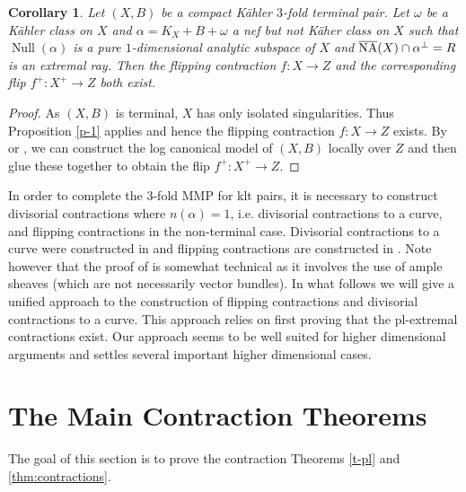 \documentclass[12pt]{amsart}
\theoremstyle{plain}
\newtheorem{corollary}[theorem]{Corollary}
\theoremstyle{remark}
\theoremstyle{definition}
\def\Null{\operatorname{Null}}
\newcommand{\<}{\leq}
\theoremstyle{definition}
\theoremstyle{definition}
\numberwithin{equation}{section}
\theoremstyle{remark}
\begin{document}
\begin{corollary}
    Let $(X,B)$ be a compact K\"ahler $3$-fold terminal pair. Let $\omega$ be a K\"ahler class on $X$ and $\alpha=K_X+B+\omega$ a nef but not K\"aher class on $X$ such that $\Null(\alpha)$ is a pure $1$-dimensional analytic subspace of $X$ and $\overline{\rm NA}(X)\cap \alpha ^\perp =R$ is an extremal ray. Then the flipping contraction $f:X\to Z$ and the corresponding flip $f^+:X^+\to Z$ both exist.
\end{corollary}
\begin{proof}
    As $(X,B)$ is  terminal, $X$ has only isolated singularities.
    Thus Proposition \ref{p-1} applies and hence the flipping contraction $f:X\to Z$ exists.
    By \cite[Theorem 1.8]{Fuj22} or \cite[Theorem 1.3]{DHP22}, we can construct the log canonical model of $(X,B)$ locally over $Z$ and then glue these together to obtain the flip $f^+:X^+\to Z$.
\end{proof}
In order to complete the 3-fold MMP for klt pairs, it is necessary to construct divisorial contractions where $n(\alpha )=1$, i.e. divisorial contractions to a curve,  and flipping contractions in the non-terminal case.
Divisorial contractions to a curve were constructed in \cite{DH20} and flipping contractions are constructed in \cite{CHP16}. Note however that the proof of \cite{CHP16} is somewhat technical as it involves the use of ample sheaves (which are not necessarily vector bundles). In what follows we will give a unified approach to the construction of flipping contractions and divisorial contractions to a curve. This approach relies on first proving that the pl-extremal contractions exist. Our approach seems to be well suited for higher dimensional arguments and settles several important higher dimensional cases. 

\section{The Main Contraction Theorems}\label{sec:main-contractions}
The goal of this section is to prove the contraction Theorems \ref{t-pl} and \ref{thm:contractions}.
\end{document}
